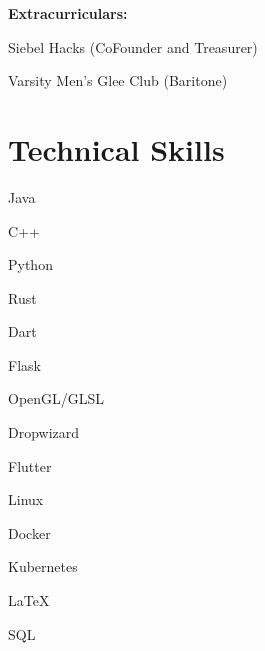 \documentclass[hidelinks]{scrartcl}
\begin{document}
\textbf{Extracurriculars:} 
\begin{citemize*}
    \item[] Siebel Hacks (CoFounder and Treasurer) 
    \item Varsity Men's Glee Club (Baritone)
\end{citemize*}

\section{Technical Skills}
{
    \item[] Java 
    \item C++ 
    \item Python 
    \item Rust
    \item Dart
}

{
    \item[] Flask
    \item OpenGL/GLSL
    \item Dropwizard
    \item Flutter
}

{
    \item[] Linux
    \item Docker
    \item Kubernetes
    \item \LaTeX
    \item SQL
}

\vfill
{\color{mycolor}\titlerule}
\end{document}
